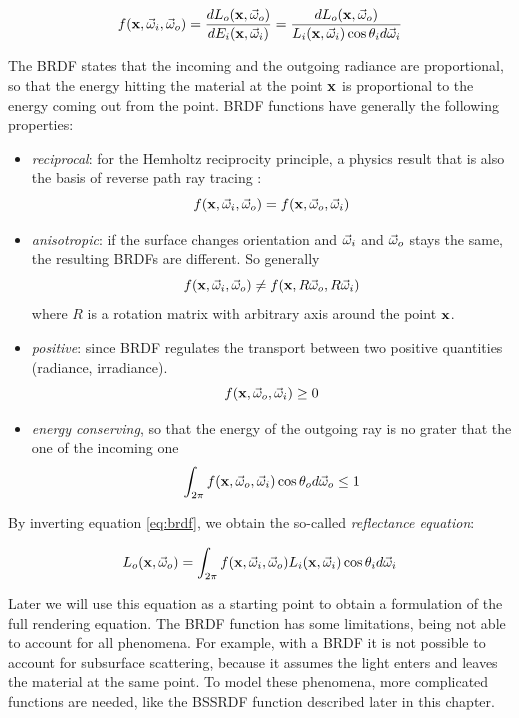 \begin{equation}
f(\mathbf{x}, \vec{\omega}_i, \vec{\omega}_o) = \frac{d L_o(\mathbf{x}, \vec{\omega}_o)}{d E_i(\mathbf{x}, \vec{\omega}_i)} = \frac{d L_o(\mathbf{x}, \vec{\omega}_o)}{L_i(\mathbf{x}, \vec{\omega}_i) \cos\theta_i d \vec{\omega}_i}
\label{eq:brdf}
\end{equation}

The BRDF states that the incoming and the outgoing radiance are proportional, so that the energy hitting the material at the point $\mathbf{x}$ is proportional to the energy coming out from the point. BRDF functions have generally the following properties:

\begin{itemize}
	\item \emph{reciprocal}: for the Hemholtz reciprocity principle, a physics result that is also the basis of reverse path ray tracing \citep{Desolneux:2007:GTI:1557413}:
	$$
	f(\mathbf{x}, \vec{\omega}_i, \vec{\omega}_o) = f(\mathbf{x}, \vec{\omega}_o, \vec{\omega}_i)
	$$
	\item \emph{anisotropic}: if the surface changes orientation and $\vec{\omega}_i$ and $\vec{\omega}_o$ stays the same, the resulting BRDFs are different. So generally
	$$
	f(\mathbf{x}, \vec{\omega}_i, \vec{\omega}_o) \neq f(\mathbf{x}, R \vec{\omega}_o, R \vec{\omega}_i)
	$$
	where $R$ is a rotation matrix with arbitrary axis around the point $\mathbf{x}$.
	\item \emph{positive}: since BRDF regulates the transport between two positive quantities (radiance, irradiance). 
	$$
	f(\mathbf{x}, \vec{\omega}_o, \vec{\omega}_i) \ge 0
	$$
	\item \emph{energy conserving}, so that the energy of the outgoing ray is no grater that the one of the incoming one 
	$$
	\int_{2\pi}  f(\mathbf{x}, \vec{\omega}_o, \vec{\omega}_i) \cos\theta_o d\vec{\omega}_o \le 1
	$$
\end{itemize}

By inverting equation \ref{eq:brdf}, we obtain the so-called \emph{reflectance equation}:

$$
L_o(\mathbf{x}, \vec{\omega}_o) = \int_{2\pi} f(\mathbf{x}, \vec{\omega}_i, \vec{\omega}_o) L_i(\mathbf{x}, \vec{\omega}_i) \cos\theta_i d\vec{\omega}_i
$$

Later we will use this equation as a starting point to obtain a formulation of the full rendering equation. The BRDF function has some limitations, being not able to account for all phenomena. For example, with a BRDF it is not possible to account for subsurface scattering, because it assumes the light enters and leaves the material at the same point. To model these phenomena, more complicated functions are needed, like the BSSRDF function described later in this chapter. 

